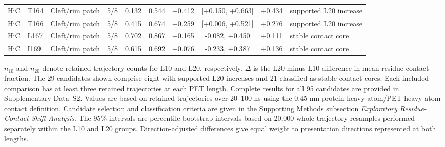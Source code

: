 \begin{landscape}
\begin{longtable}{@{}lllcS[table-format=1.3]S[table-format=1.3]S[table-format=+1.3,retain-explicit-plus=true]cS[table-format=+1.3,retain-explicit-plus=true]l@{}}
HiC & T164 & Cleft/rim patch & 5/8 & 0.132 & 0.544 & +0.412 & [+0.150, +0.663] & +0.434 & supported L20 increase \\
HiC & T166 & Cleft/rim patch & 5/8 & 0.415 & 0.674 & +0.259 & [+0.006, +0.521] & +0.276 & supported L20 increase \\
HiC & L167 & Cleft/rim patch & 5/8 & 0.702 & 0.867 & +0.165 & [-0.082, +0.450] & +0.111 & stable contact core \\
HiC & I169 & Cleft/rim patch & 5/8 & 0.615 & 0.692 & +0.076 & [-0.233, +0.387] & +0.136 & stable contact core \\
\end{longtable}
\footnotesize
$n_{10}$ and $n_{20}$ denote retained-trajectory counts for L10 and L20, respectively. $\Delta$ is the L20-minus-L10 difference in mean residue contact fraction. The 29 candidates shown comprise eight with supported L20 increases and 21 classified as stable contact cores. Each included comparison has at least three retained trajectories at each PET length. Complete results for all 95 candidates are provided in Supplementary Data~S2. Values are based on retained trajectories over 20--100 ns using the 0.45 nm protein-heavy-atom/PET-heavy-atom contact definition. Candidate selection and classification criteria are given in the Supporting Methods subsection \textit{Exploratory Residue-Contact Shift Analysis}. The 95\% intervals are percentile bootstrap intervals based on 20,000 whole-trajectory resamples performed separately within the L10 and L20 groups. Direction-adjusted differences give equal weight to presentation directions represented at both lengths.
\end{landscape}
